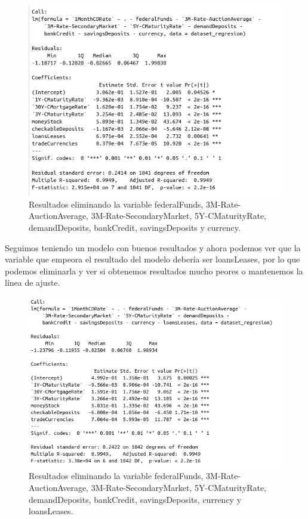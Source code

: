 \documentclass[12pt,a4paper]{article}
\begin{document}
\begin{figure}[H]
	\centering 
	\includegraphics[scale=0.6]{./Imagenes/Regresion/regresion_multiple9.png}
	\caption{Resultados eliminando la variable federalFunds, 3M-Rate-AuctionAverage, 3M-Rate-SecondaryMarket, 5Y-CMaturityRate, demandDeposits, bankCredit, savingsDeposits y currency.}
\end{figure}

Seguimos teniendo un modelo con buenos resultados y ahora podemos ver que la variable que empeora el resultado del modelo debería ser loansLeases, por lo que podemos eliminarla y ver si obtenemos resultados mucho peores o mantenemos la línea de ajuste.

\begin{figure}[H]
	\centering 
	\includegraphics[scale=0.6]{./Imagenes/Regresion/regresion_multiple10.png}
	\caption{Resultados eliminando la variable federalFunds, 3M-Rate-AuctionAverage, 3M-Rate-SecondaryMarket, 5Y-CMaturityRate, demandDeposits, bankCredit, savingsDeposits, currency y loansLeases.}
\end{figure}
\end{document}
